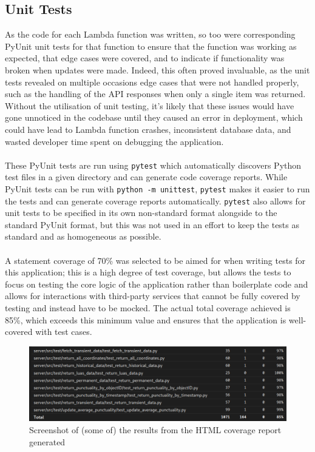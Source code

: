 \documentclass[a4paper,11pt]{report}
\begin{document}
\subsection{Unit Tests}
As the code for each Lambda function was written, so too were corresponding PyUnit\supercite{pyunit} unit tests for that function to ensure that the function was working as expected, that edge cases were covered, and to indicate if functionality was broken when updates were made.
Indeed, this often proved invaluable, as the unit tests revealed on multiple occasions edge cases that were not handled properly, such as the handling of the API responses when only a single item was returned.
Without the utilisation of unit testing, it's likely that these issues would have gone unnoticed in the codebase until they caused an error in deployment, which could have lead to Lambda function crashes, inconsistent database data, and wasted developer time spent on debugging the application.
\\\\
These PyUnit tests are run using \texttt{pytest}\supercite{pytest} which automatically discovers Python test files in a given directory and can generate code coverage reports.
While PyUnit tests can be run with \texttt{python -m unittest}, \texttt{pytest} makes it easier to run the tests and can generate coverage reports automatically.
\texttt{pytest} also allows for unit tests to be specified in its own non-standard format alongside to the standard PyUnit format, but this was not used in an effort to keep the tests as standard and as homogeneous as possible.
\\\\
A statement coverage of 70\% was selected to be aimed for when writing tests for this application;
this is a high degree of test coverage, but allows the tests to focus on testing the core logic of the application rather than boilerplate code and allows for interactions with third-party services that cannot be fully covered by testing and instead have to be mocked\supercite{pyunitmock}.
The actual total coverage achieved is 85\%, which exceeds this minimum value and ensures that the application is well-covered with test cases.

\begin{figure}[H]
    \centering
    \includegraphics[width=\textwidth]{./images/testcoverage.png}
    \caption{Screenshot of (some of) the results from the HTML coverage report generated}
\end{figure}
\end{document}
